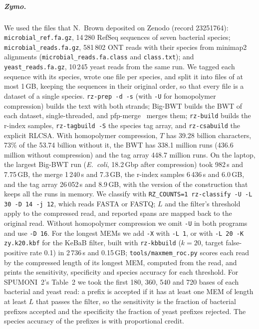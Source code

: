 \subparagraph*{Zymo.}
We used the files that N.~Brown deposited on Zenodo (record 23251764): \nolinkurl{microbial_ref.fa.gz}, 14\,280 RefSeq sequences of seven bacterial species; \nolinkurl{microbial_reads.fa.gz}, 581\,802 ONT reads with their species from minimap2 alignments (\nolinkurl{microbial_reads.fa.class} and \nolinkurl{class.txt}); and \nolinkurl{yeast_reads.fa.gz}, 10\,245 yeast reads from the same run.
We tagged each sequence with its species, wrote one file per species, and split it into files of at most 1\,GB, keeping the sequences in their original order, so that every file is a dataset of a single species.
\texttt{rz-prep -d -s} (with \texttt{-U} for homopolymer compression) builds the text with both strands; Big-BWT builds the BWT of each dataset, single-threaded, and pfp-merge~\cite{BoucherEtAl2019} merges them; \texttt{rz-build} builds the r-index samples, \texttt{rz-tagbuild -S} the species tag array, and \texttt{rz-csabuild} the explicit RLCSA.
With homopolymer compression, $T$ has 39.28 billion characters, 73\% of the 53.74 billion without it, the BWT has 338.1 million runs (436.6 million without compression) and the tag array 448.7 million runs.
On the laptop, the largest Big-BWT run (\emph{E.~coli}, 18.2\,Gbp after compression) took 982\,s and 7.75\,GB, the merge 1\,240\,s and 7.3\,GB, the r-index samples 6\,436\,s and 6.0\,GB, and the tag array 26\,052\,s and 8.9\,GB, with the version of the construction that keeps all the runs in memory.
We classify with \nolinkurl{RZ_COUNTS=1 rz-classify -U -L 30 -D 14 -j 12}, which reads FASTA or FASTQ; $L$ and the filter's threshold apply to the compressed read, and reported spans are mapped back to the original read.
Without homopolymer compression we omit \nolinkurl{-U} in both programs and use \nolinkurl{-D 16}.
For the longest MEMs we add \nolinkurl{-X} with \nolinkurl{-L 1}, or with \nolinkurl{-L 20 -K zy.k20.kbf} for the KeBaB filter, built with \nolinkurl{rz-kbbuild} ($k = 20$, target false-positive rate 0.1) in 2\,736\,s and 0.15\,GB; \nolinkurl{tools/maxmem_roc.py} scores each read by the compressed length of its longest MEM, computed from the read, and prints the sensitivity, specificity and species accuracy for each threshold.
For SPUMONI~2's Table~2 we took the first 180, 360, 540 and 720 bases of each bacterial and yeast read: a prefix is accepted if it has at least one MEM of length at least $L$ that passes the filter, so the sensitivity is the fraction of bacterial prefixes accepted and the specificity the fraction of yeast prefixes rejected.
The species accuracy of the prefixes is with proportional credit.

